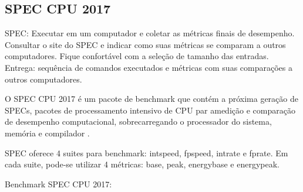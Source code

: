 \subsection{SPEC CPU 2017}

SPEC: Executar em um computador e coletar as métricas finais de desempenho. Consultar o site do SPEC e indicar como suas métricas se comparam a outros computadores. Fique confortável com a seleção de tamanho das entradas. Entrega: sequência de comandos executados e métricas com suas comparações a outros computadores.

O SPEC CPU 2017 é um pacote de benchmark que contém a próxima geração de SPECs, pacotes de processamento intensivo de CPU par amedição e comparação de desempenho computacional, sobrecarregando o processador do sistema, memória e compilador \cite{spec_2017}.

SPEC oferece 4 suites para benchmark: intspeed, fpspeed, intrate e fprate. Em cada suite, pode-se utilizar 4 métricas: base, peak, energy\textunderscore base e energy\textunderscore peak. 

Benchmark SPEC CPU 2017: 

